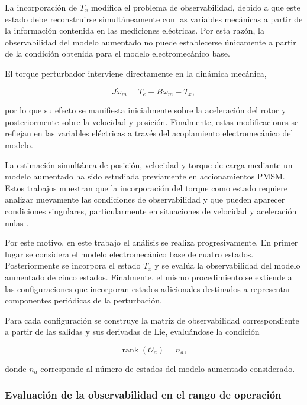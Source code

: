 La incorporación de $T_x$ modifica el problema de observabilidad, debido a que
este estado debe reconstruirse simultáneamente con las variables mecánicas a
partir de la información contenida en las mediciones eléctricas. Por esta razón,
la observabilidad del modelo aumentado no puede establecerse únicamente a partir
de la condición obtenida para el modelo electromecánico base.

El torque perturbador interviene directamente en la dinámica mecánica,

\begin{equation}
    J\dot{\omega}_m
    =
    T_e
    -
    B\omega_m
    -
    T_x,
\end{equation}

por lo que su efecto se manifiesta inicialmente sobre la aceleración del rotor y
posteriormente sobre la velocidad y posición. Finalmente, estas modificaciones
se reflejan en las variables eléctricas a través del acoplamiento
electromecánico del modelo.

La estimación simultánea de posición, velocidad y torque de carga mediante un
modelo aumentado ha sido estudiada previamente en accionamientos PMSM. Estos
trabajos muestran que la incorporación del torque como estado requiere analizar
nuevamente las condiciones de observabilidad y que pueden aparecer condiciones
singulares, particularmente en situaciones de velocidad y aceleración nulas
\cite{zgorskiSensorlessPositionControl2013}.

Por este motivo, en este trabajo el análisis se realiza progresivamente. En
primer lugar se considera el modelo electromecánico base de cuatro estados.
Posteriormente se incorpora el estado $T_x$ y se evalúa la observabilidad del
modelo aumentado de cinco estados. Finalmente, el mismo procedimiento se extiende
a las configuraciones que incorporan estados adicionales destinados a representar
componentes periódicas de la perturbación.

Para cada configuración se construye la matriz de observabilidad correspondiente
a partir de las salidas y sus derivadas de Lie, evaluándose la condición

\begin{equation}
    \operatorname{rank}
    \left(
        \mathcal{O}_a
    \right)
    =
    n_a,
\end{equation}

donde $n_a$ corresponde al número de estados del modelo aumentado considerado.

\subsubsection{Evaluación de la observabilidad en el rango de operación}

